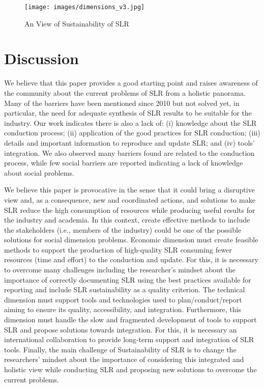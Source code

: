 \documentclass{article}
\begin{document}
\begin{figure}
    \centering
    \texttt{[image: images/dimensions\_v3.jpg]}
    \caption{An View of Sustainability of SLR}
    \label{fig:sustainabilityModels}
\end{figure}


\section{Discussion}\label{sec:discussion}


We believe that this paper provides a good starting point and raises awareness of the community about the current problems of SLR from a holistic panorama. Many of the barriers have been mentioned since 2010 but 
not 
solved 
yet, in particular, the need for adequate synthesis of SLR results to be suitable for the industry. 
Our work indicates 
there is also a lack of: (i) knowledge about the SLR conduction process; (ii) application of the good practices
for SLR conduction; (iii) details and important information to reproduce and update SLR; and (iv) tools' integration. 
We also observed 
many barriers found are related to the conduction process, while few social barriers are reported indicating a lack of knowledge about social problems.  


We believe this paper is provocative in the sense that it could bring a disruptive view and, as a consequence, new and coordinated actions, and solutions to make SLR reduce the high consumption of resources while producing useful results for the industry and academia. In this context, create effective methods to include the stakeholders (i.e., members of the industry) could be one of the possible solutions for social dimension problems. Economic dimension must create feasible methods to support the production of high-quality SLR consuming fewer resources (time and effort) to the conduction and update. For this, it is necessary to overcome many challenges including the researcher's mindset about the importance of correctly documenting SLR using the best practices available for reporting and include SLR sustainability as a quality criterion. The technical dimension must support tools and technologies used to plan/conduct/report aiming to ensure its quality, accessibility, and integration. Furthermore, this dimension must handle the slow and fragmented development of tools to support SLR and propose solutions towards integration. For this, it is necessary an international collaboration to provide long-term support and integration of SLR tools. Finally, the main challenge of Sustainability of SLR is to change the researchers' mindset about the importance of considering this integrated and holistic view while conducting SLR and proposing new solutions to overcome the current problems.
\end{document}
